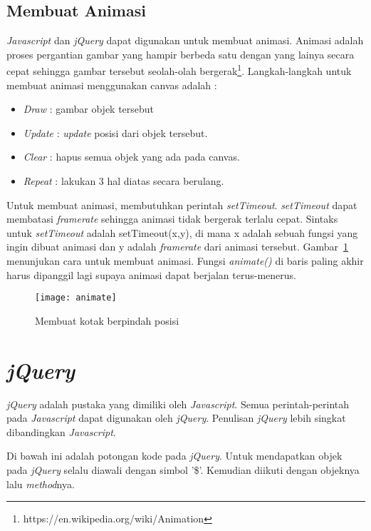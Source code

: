 \subsection{Membuat Animasi}
\textit{Javascript} dan \textit{jQuery} dapat digunakan untuk membuat animasi. Animasi adalah proses pergantian gambar yang hampir berbeda satu dengan yang lainya secara cepat sehingga gambar tersebut seolah-olah bergerak\footnote{https://en.wikipedia.org/wiki/Animation}. Langkah-langkah untuk membuat animasi menggunakan canvas adalah :

\begin{itemize}
	\item \textit{Draw} : gambar objek tersebut
	\item \textit{Update} : \textit{update} posisi dari objek tersebut.
	\item \textit{Clear} : hapus semua objek yang ada pada canvas.
	\item \textit{Repeat} : lakukan 3 hal diatas secara berulang.
\end{itemize}

Untuk membuat animasi, membutuhkan perintah \textit{setTimeout}. \textit{setTimeout} dapat membatasi \textit{framerate} sehingga animasi tidak bergerak terlalu cepat. Sintaks untuk \textit{setTimeout} adalah setTimeout(x,y), di mana x adalah sebuah fungsi yang ingin dibuat animasi dan y adalah \textit{framerate} dari animasi tersebut. Gambar~\ref{fig:animate} menunjukan cara untuk membuat animasi. Fungsi \textit{animate()} di baris paling akhir harus dipanggil lagi supaya animasi dapat berjalan terus-menerus.

\begin{figure}[H]
	\centering  
	\texttt{[image: animate]}
	\caption[Membuat kotak berpindah posisi]{Membuat kotak berpindah posisi}
	\label{fig:animate} 
\end{figure} 

\section{\textit{jQuery}}
\textit{jQuery} adalah pustaka yang dimiliki oleh \textit{Javascript}. Semua perintah-perintah pada \textit{Javascript} dapat digunakan oleh \textit{jQuery}. Penulisan \textit{jQuery} lebih singkat dibandingkan \textit{Javascript}.

Di bawah ini adalah potongan kode pada \textit{jQuery}. Untuk mendapatkan objek pada \textit{jQuery} selalu diawali dengan simbol '\$'. Kemudian diikuti dengan objeknya lalu \textit{method}nya. 

